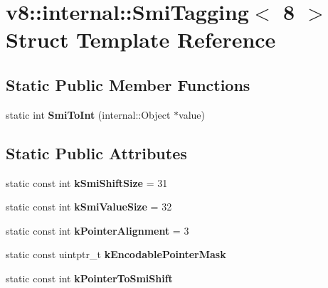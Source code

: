 \hypertarget{structv8_1_1internal_1_1_smi_tagging_3_018_01_4}{}\section{v8\+:\+:internal\+:\+:Smi\+Tagging$<$ 8 $>$ Struct Template Reference}
\label{structv8_1_1internal_1_1_smi_tagging_3_018_01_4}
\subsection*{Static Public Member Functions}
\begin{DoxyCompactItemize}
\item 
\hypertarget{structv8_1_1internal_1_1_smi_tagging_3_018_01_4_a4103aa6decb48426824509917ab3b50e}{}static int {\bfseries Smi\+To\+Int} (internal\+::\+Object $\ast$value)\label{structv8_1_1internal_1_1_smi_tagging_3_018_01_4_a4103aa6decb48426824509917ab3b50e}

\end{DoxyCompactItemize}
\subsection*{Static Public Attributes}
\begin{DoxyCompactItemize}
\item 
\hypertarget{structv8_1_1internal_1_1_smi_tagging_3_018_01_4_a9a3b3da7b6d82417b961c8bed4366407}{}static const int {\bfseries k\+Smi\+Shift\+Size} = 31\label{structv8_1_1internal_1_1_smi_tagging_3_018_01_4_a9a3b3da7b6d82417b961c8bed4366407}

\item 
\hypertarget{structv8_1_1internal_1_1_smi_tagging_3_018_01_4_a08ad86fa77f6faee6ec744abdb0f6dce}{}static const int {\bfseries k\+Smi\+Value\+Size} = 32\label{structv8_1_1internal_1_1_smi_tagging_3_018_01_4_a08ad86fa77f6faee6ec744abdb0f6dce}

\item 
\hypertarget{structv8_1_1internal_1_1_smi_tagging_3_018_01_4_a9e1cba2a4357caa90cd199ed96407aff}{}static const int {\bfseries k\+Pointer\+Alignment} = 3\label{structv8_1_1internal_1_1_smi_tagging_3_018_01_4_a9e1cba2a4357caa90cd199ed96407aff}

\item 
static const uintptr\+\_\+t {\bfseries k\+Encodable\+Pointer\+Mask}
\item 
static const int {\bfseries k\+Pointer\+To\+Smi\+Shift}
\end{DoxyCompactItemize}


